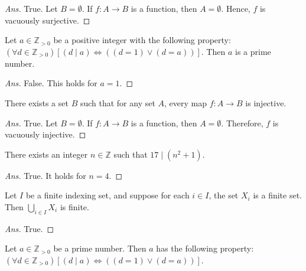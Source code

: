 \documentclass[12pt]{article}
\newenvironment{problem}[2][Problem]{\begin{trivlist}
\item[\hskip \labelsep {\bfseries #1}\hskip \labelsep {\bfseries #2.}]}{\end{trivlist}}
\begin{document}
\begin{proof}[Ans]
True. Let $B = \emptyset$. If $f : A \to B$ is a function, then $A = \emptyset$. Hence, $f$ is vacuously surjective.
\end{proof}

\begin{problem}{16}
Let $a \in \mathbb{Z}_{>0}$ be a positive integer with the following property:\newline
$(\forall d \in \mathbb{Z}_{>0}) \left[(d \mid a) \Leftrightarrow
((d = 1) \lor (d = a)) \right]$. Then $a$ is a prime number.
\end{problem}

\begin{proof}[Ans]
False. This holds for $a = 1$.
\end{proof}

\begin{problem}{17}
There exists a set $B$ such that for any set $A$,
every map $f : A \rightarrow B$ is injective.

\end{problem}

\begin{proof}[Ans]
True. Let $B = \emptyset$. If $f : A \to B$ is a function, then $A = \emptyset$. Therefore, $f$ is vacuously injective.
\end{proof}

\begin{problem}{18}
There exists an integer $n \in \mathbb{Z}$ such that $17 \mid (n^2+1)$.
\end{problem}

\begin{proof}[Ans]
True. It holds for $n = 4$.
\end{proof}

\begin{problem}{19}
Let $I$ be a finite indexing set, and suppose for each $i \in I$,
the set $X_i$ is a finite set. Then $\bigcup_{i \in I} X_i$ is finite.

\end{problem}

\begin{proof}[Ans]
True.
\end{proof}

\begin{problem}{20}
Let $a \in \mathbb{Z}_{>0}$ be a prime number. Then $a$ has the following property:
$(\forall d \in \mathbb{Z}_{>0}) \left[(d \mid a) \Leftrightarrow
((d = 1) \lor (d = a)) \right]$.
\end{problem}
\end{document}
